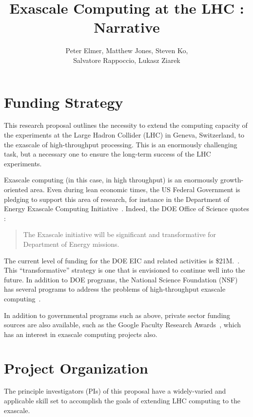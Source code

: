 \documentclass[12pt]{article}
\begin{document}
\title{Exascale Computing at the LHC : Narrative}
\author{Peter Elmer, Matthew Jones, Steven Ko,\\ Salvatore Rappoccio, Lukasz Ziarek}

\maketitle

\clearpage

\section{Funding Strategy}

This research proposal outlines the necessity to extend the computing
capacity of the experiments at the Large Hadron Collider (LHC) in
Geneva, Switzerland, to the exascale of high-throughput
processing. This is an enormously challenging task, but a necessary
one to ensure the long-term success of the LHC experiments. 

Exascale computing (in this case, in high throughput)
is an enormously growth-oriented area. Even during
lean economic times, the US Federal Government is pledging to support
this area of research, for instance in the Department of Energy
Exascale Computing Initiative~\cite{doe_eci}. Indeed, the DOE Office of
Science quotes :
\begin{quote}
The Exascale initiative will be significant and transformative for Department of Energy missions.
\end{quote}
The current level of funding for the DOE EIC and related activities is
\$21M.~\cite{doe_eci_budget}. This ``transformative'' strategy is one
that is envisioned to continue well into the future. 
In addition to DOE programs, the
National Science Foundation (NSF) has several programs to address the
problems of high-throughput exascale computing~\cite{nsf1,nsf2}.

In addition to governmental programs such as above, private sector
funding sources are also available, such as the Google Faculty
Research Awards~\cite{google_fac_awards}, which has an interest in
exascale computing projects also. 


\clearpage

\section{Project Organization}

The principle investigators (PIs) of this proposal have a
widely-varied and applicable skill set to accomplish the goals of
extending LHC computing to the exascale. 
\end{document}
